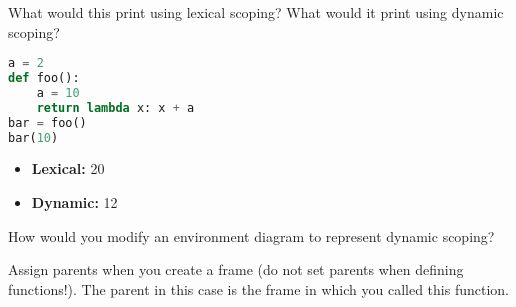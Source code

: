 \begin{blocksection}
\question What would this print using lexical scoping? What would it print using
dynamic scoping?

\begin{lstlisting}[language=Python]
a = 2
def foo():
    a = 10
    return lambda x: x + a
bar = foo()
bar(10)
\end{lstlisting}
\begin{solution}[0.25in]
\begin{itemize}
    \item \textbf{Lexical:} 20
    \item \textbf{Dynamic:} 12
\end{itemize}
\end{solution}

\question How would you modify an environment diagram to represent dynamic
scoping?

\begin{solution}[0.5in]
Assign parents when you create a frame (do not set parents when defining
functions!). The parent in this case is the frame in which you called this
function.
\end{solution}

\end{blocksection}

